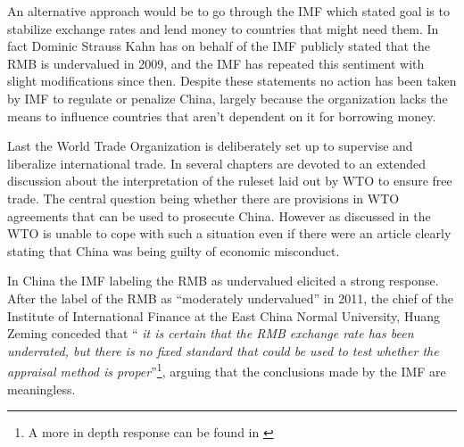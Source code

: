 An alternative approach would be to go through the IMF which stated goal 
is to stabilize exchange rates and lend money to countries that might 
need them. In fact Dominic Strauss Kahn has on behalf of the IMF 
publicly stated that the RMB is undervalued in 2009, and the IMF has 
repeated this sentiment with slight modifications since 
then\cite{reuters09}.  Despite these statements no action has been taken 
by IMF to regulate or penalize China, largely because the organization 
lacks the means to influence countries that aren't dependent on it for 
borrowing money.

Last the World Trade Organization is deliberately set up to supervise 
and liberalize international trade. In \cite{Evenett10} several chapters 
are devoted to an extended discussion about the interpretation of the 
ruleset laid out by WTO to ensure free trade. The central question being 
whether there are provisions in WTO agreements that can be used to 
prosecute China.  However as discussed in \cite{Levy11} the WTO is 
unable to cope with such a situation even if there were an article 
clearly stating that China was being guilty of economic misconduct.

In China the IMF labeling the RMB as undervalued elicited a strong 
response. After the label of the RMB as ``moderately undervalued'' in 
2011, the chief of the Institute of International Finance at the East 
China Normal University, Huang Zeming conceded that ``\textit{ it is 
	certain that the RMB exchange rate has been underrated, but there is 
	no fixed standard that could be used to test whether the appraisal 
method is proper}''\footnote{A more in depth response can be found in 
\cite{ChinaDaily11}}, arguing that the conclusions made by the IMF are 
meaningless.







